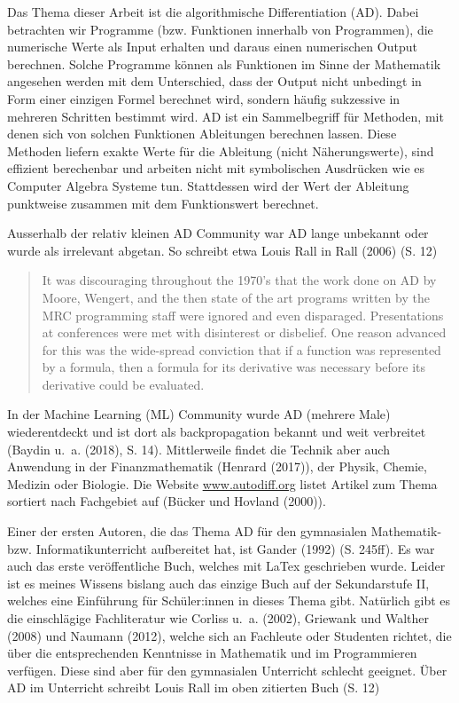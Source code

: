 \documentclass[
  a4paper,
  DIV=11]{scrreprt}
\theoremstyle{definition}
\theoremstyle{definition}
\theoremstyle{remark}
\begin{document}

Das Thema dieser Arbeit ist die algorithmische Differentiation (AD).
Dabei betrachten wir Programme (bzw. Funktionen innerhalb von
Programmen), die numerische Werte als Input erhalten und daraus einen
numerischen Output berechnen. Solche Programme können als Funktionen im
Sinne der Mathematik angesehen werden mit dem Unterschied, dass der
Output nicht unbedingt in Form einer einzigen Formel berechnet wird,
sondern häufig sukzessive in mehreren Schritten bestimmt wird. AD ist
ein Sammelbegriff für Methoden, mit denen sich von solchen Funktionen
Ableitungen berechnen lassen. Diese Methoden liefern exakte Werte für
die Ableitung (nicht Näherungswerte), sind effizient berechenbar und
arbeiten nicht mit symbolischen Ausdrücken wie es Computer Algebra
Systeme tun. Stattdessen wird der Wert der Ableitung punktweise zusammen
mit dem Funktionswert berechnet.

Ausserhalb der relativ kleinen AD Community war AD lange unbekannt oder
wurde als irrelevant abgetan. So schreibt etwa Louis Rall in Rall (2006)
(S. 12)

\begin{quote}
It was discouraging throughout the 1970's that the work done on AD by
Moore, Wengert, and the then state of the art programs written by the
MRC programming staff were ignored and even disparaged. Presentations at
conferences were met with disinterest or disbelief. One reason advanced
for this was the wide-spread conviction that if a function was
represented by a formula, then a formula for its derivative was
necessary before its derivative could be evaluated.
\end{quote}

In der Machine Learning (ML) Community wurde AD (mehrere Male)
wiederentdeckt und ist dort als backpropagation bekannt und weit
verbreitet (Baydin u.~a. (2018), S. 14). Mittlerweile findet die Technik
aber auch Anwendung in der Finanzmathematik (Henrard (2017)), der
Physik, Chemie, Medizin oder Biologie. Die Website
\href{https://autodiff.org/?module=Applications}{www.autodiff.org}
listet Artikel zum Thema sortiert nach Fachgebiet auf (Bücker und
Hovland (2000)).

Einer der ersten Autoren, die das Thema AD für den gymnasialen
Mathematik- bzw. Informatikunterricht aufbereitet hat, ist Gander (1992)
(S. 245ff). Es war auch das erste veröffentliche Buch, welches mit LaTex
geschrieben wurde. Leider ist es meines Wissens bislang auch das einzige
Buch auf der Sekundarstufe II, welches eine Einführung für Schüler:innen
in dieses Thema gibt. Natürlich gibt es die einschlägige Fachliteratur
wie Corliss u.~a. (2002), Griewank und Walther (2008) und Naumann
(2012), welche sich an Fachleute oder Studenten richtet, die über die
entsprechenden Kenntnisse in Mathematik und im Programmieren verfügen.
Diese sind aber für den gymnasialen Unterricht schlecht geeignet. Über
AD im Unterricht schreibt Louis Rall im oben zitierten Buch (S. 12)
\end{document}
